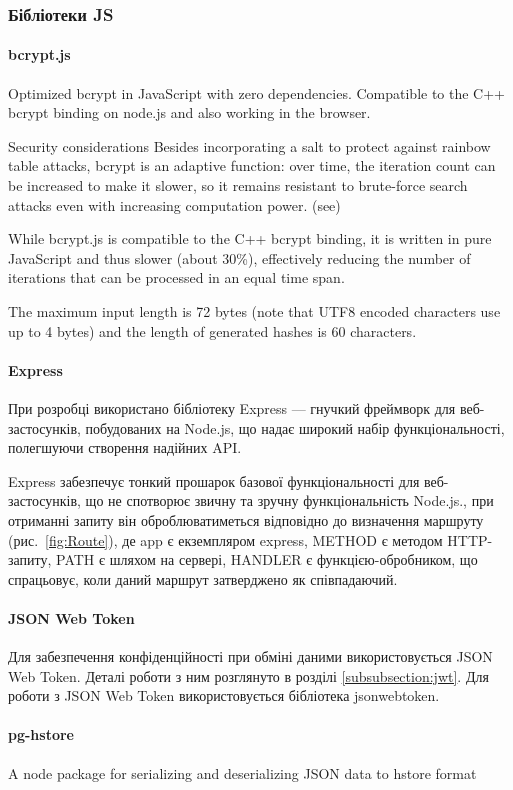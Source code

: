 \subsubsection{Бібліотеки JS}

\paragraph{bcrypt.js}

Optimized bcrypt in JavaScript with zero dependencies. Compatible to the C++ bcrypt binding on node.js and also working in the browser.

Security considerations
Besides incorporating a salt to protect against rainbow table attacks, bcrypt is an adaptive function: over time, the iteration count can be increased to make it slower, so it remains resistant to brute-force search attacks even with increasing computation power. (see)

While bcrypt.js is compatible to the C++ bcrypt binding, it is written in pure JavaScript and thus slower (about 30\%), effectively reducing the number of iterations that can be processed in an equal time span.

The maximum input length is 72 bytes (note that UTF8 encoded characters use up to 4 bytes) and the length of generated hashes is 60 characters.

\paragraph{Express}

При розробці використано бібліотеку Express — гнучкий фреймворк для веб-застосунків, побудованих на Node.js, що надає широкий набір функціональності, полегшуючи створення надійних API.

Express забезпечує тонкий прошарок базової функціональності для веб-застосунків, що не спотворює звичну та зручну функціональність Node.js., при отриманні запиту він оброблюватиметься відповідно до визначення маршруту (рис.~\ref{fig:Route}), де app є екземпляром express, METHOD є методом HTTP-запиту, PATH є шляхом на сервері, HANDLER є функцією-обробником, що спрацьовує, коли даний маршрут затверджено як співпадаючий.

\paragraph{JSON Web Token}

Для забезпечення конфіденційності при обміні даними використовується JSON Web Token. Деталі роботи з ним розглянуто в розділі \ref{subsubsection:jwt}. Для роботи з JSON Web Token використовується бібліотека jsonwebtoken.

\paragraph{pg-hstore}

A node package for serializing and deserializing JSON data to hstore format

